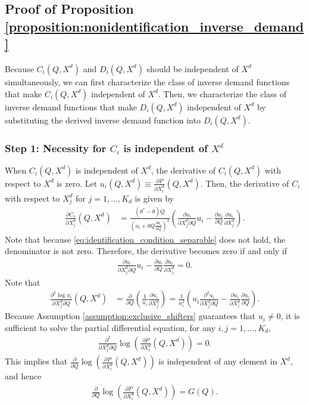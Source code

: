 \documentclass[11pt, a4paper]{article}
\theoremstyle{remark}
\begin{document}
\subsection{Proof of Proposition \ref{proposition:nonidentification_inverse_demand}}


Because $C_i(Q, X^{d})$ and $D_i(Q, X^{d})$ should be independent of $X^{d}$ simultaneously, we can first characterize the class of inverse demand functions that make $C_i(Q, X^{d})$ independent of $X^{d}$.
Then, we characterize the class of inverse demand functions that make $D_i(Q, X^{d})$ independent of $X^{d}$ by substituting the derived inverse demand function into $D_i(Q, X^{d})$.

\subsubsection*{Step 1: Necessity for $C_i$ is independent of $X^{d}$}
When $C_i(Q, X^{d})$ is independent of $X^{d}$, the derivative of $C_i(Q, X^{d})$ with respect to $X^{d}$ is zero.
Let $u_i(Q, X^{d}) \equiv \frac{\partial P}{\partial X^{d}_i}(Q, X^{d})$.
Then, the derivative of $C_i$ with respect to $X^{d}_j$ for $j = 1, \ldots, K_d$ is given by
\begin{align}
    \frac{\partial C_i}{\partial X^{d}_j}(Q, X^{d}) & = \frac{(\theta^{*} - \theta)Q }{\left(u_i + \theta Q \frac{\partial u_i}{\partial Q}\right)^2}\left(\frac{\partial u_i}{\partial X^{d}_j\partial Q} u_i - \frac{\partial u_i}{\partial Q} \frac{\partial u_i}{\partial X^{d}_j}\right).
\end{align}
Note that because \eqref{eq:identification_condition_separable} does not hold, the denominator is not zero.
Therefore, the derivative becomes zero if and only if
\begin{align}
    \frac{\partial u_i}{\partial X^{d}_j\partial Q} u_i - \frac{\partial u_i}{\partial Q} \frac{\partial u_i}{\partial X^{d}_j} = 0.
\end{align}
Note that 
\begin{align}
    \frac{\partial^2 \log u_i}{\partial X^{d}_j \partial Q}(Q, X^{d}) & = \frac{\partial }{\partial Q}\left(\frac{1}{u_i}\frac{\partial u_i}{\partial X^{d}_j}\right) = \frac{1}{u_i^2}\left(u_i\frac{\partial^2 u_i}{\partial X^{d}_j \partial Q} - \frac{\partial u_i}{\partial X^{d}_j}\frac{\partial u_i}{\partial Q}\right).
\end{align}
Because Assumption \ref{assumption:exclusive_shifters} guarantees that $u_i \ne 0$, it is sufficient to solve the partial differential equation, for any $i,j = 1, \ldots, K_d$,
\begin{align}
    \frac{\partial^2 }{\partial X^{d}_j \partial Q}\log \left(\frac{\partial P}{\partial X^{d}_i}(Q, X^{d})\right) = 0.
\end{align}
This implies that $\frac{\partial }{\partial Q}\log \left(\frac{\partial P}{\partial X^{d}_i}(Q, X^{d})\right)$ is independent of any element in $X^{d}$, and hence
\begin{align}
    \frac{\partial }{\partial Q}\log \left(\frac{\partial P}{\partial X^{d}_i}(Q, X^{d})\right) = G(Q).
\end{align}
\end{document}
